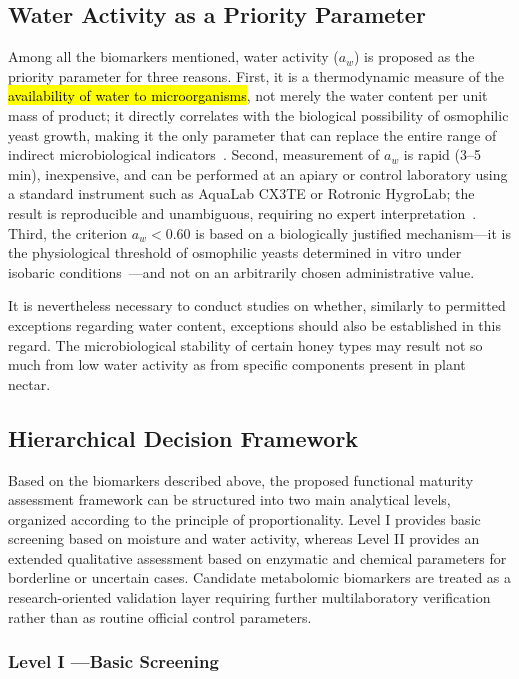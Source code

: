 \documentclass[foods,review,accept,pdftex,moreauthors]{Definitions/mdpi}
\begin{document}
{\subsection{Water Activity as a Priority Parameter}

Among all the biomarkers mentioned, water activity
($a_w$) is proposed as the priority parameter for three reasons.
First, it is a thermodynamic measure of the \hl{availability
of water to microorganisms}, not merely the water content per unit
mass of product; it directly correlates with the biological
possibility of osmophilic yeast growth, making it the only
parameter that can replace the entire range of indirect
microbiological indicators~\cite{ruegg1981,waaw2006}.
Second, measurement of $a_w$ is rapid (3--5 min), inexpensive,
and can be performed at an apiary or control laboratory using a
standard instrument such as AquaLab CX3TE or Rotronic HygroLab;
the result is reproducible and unambiguous, requiring no expert
interpretation~\cite{zamora2006}.
Third, the criterion $a_w < 0.60$ is based on a biologically
justified mechanism---it is the physiological threshold of
osmophilic yeasts determined in vitro under isobaric
conditions~\cite{waaw2006,ruegg1981}---and not on an arbitrarily
chosen administrative value.

It is nevertheless necessary to conduct studies on whether,
similarly to permitted exceptions regarding water content, exceptions
should also be established in this regard. The microbiological
stability of certain honey types may result not so much from low
water activity as from specific components present in plant nectar.


\subsection{Hierarchical Decision Framework}

{
Based on the biomarkers described above, the proposed functional maturity assessment framework can be structured into two main analytical levels, organized according to the principle of proportionality. Level I provides basic screening based on moisture and water activity, whereas Level II provides an extended qualitative assessment based on enzymatic and chemical parameters for borderline or uncertain cases. Candidate metabolomic biomarkers are treated as a research-oriented validation layer requiring further multilaboratory verification rather than as routine official control parameters.
}

\subsubsection{Level I ---Basic Screening}

}
\end{document}
